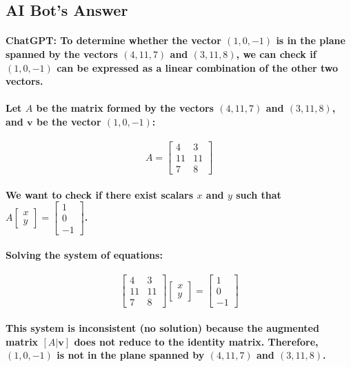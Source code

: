 \documentclass[11pt]{article} %
\begin{document}
\subsection{AI Bot's Answer}
\begin{mdframed}[
        backgroundcolor=white,  %
        linecolor=black,        %
        leftmargin=5pt,         %
        rightmargin=5pt,        %
        linewidth=2pt           %
    ]
    \paragraph{\textbf{ChatGPT}: To determine whether the vector \( (1, 0, -1) \) is in the plane spanned by the vectors \( (4, 11, 7) \) and \( (3, 11, 8) \), we can check if \( (1, 0, -1) \) can be expressed as a linear combination of the other two vectors.}
    \paragraph{Let \( A \) be the matrix formed by the vectors \( (4, 11, 7) \) and \( (3, 11, 8) \), and \( \mathbf{v} \) be the vector \( (1, 0, -1) \):}
    \[ A = \begin{bmatrix} 4 & 3 \\ 11 & 11 \\ 7 & 8 \end{bmatrix} \]
    \paragraph{We want to check if there exist scalars \( x \) and \( y \) such that \( A \begin{bmatrix} x \\ y \end{bmatrix} = \begin{bmatrix} 1 \\ 0 \\ -1 \end{bmatrix} \).}
    \paragraph{Solving the system of equations:}
    \[ \begin{bmatrix} 4 & 3 \\ 11 & 11 \\ 7 & 8 \end{bmatrix} \begin{bmatrix} x \\ y \end{bmatrix} = \begin{bmatrix} 1 \\ 0 \\ -1 \end{bmatrix} \]
    \paragraph{This system is inconsistent (no solution) because the augmented matrix \([A | \mathbf{v}]\) does not reduce to the identity matrix. Therefore, \( (1, 0, -1) \) is not in the plane spanned by \( (4, 11, 7) \) and \( (3, 11, 8) \).}
\end{mdframed}
\end{document}
